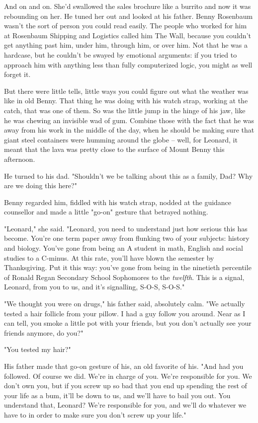 And on and on. She'd swallowed the sales brochure like a burrito
and now it was rebounding on her. He tuned her out and looked at
his father. Benny Rosenbaum wasn't the sort of person you could
read easily. The people who worked for him at Rosenbaum Shipping
and Logistics called him The Wall, because you couldn't get
anything past him, under him, through him, or over him. Not that he
was a hardcase, but he couldn't be swayed by emotional arguments:
if you tried to approach him with anything less than fully
computerized logic, you might as well forget it.

But there were little tells, little ways you could figure out what
the weather was like in old Benny. That thing he was doing with his
watch strap, working at the catch, that was one of them. So was the
little jump in the hinge of his jaw, like he was chewing an
invisible wad of gum. Combine those with the fact that he was away
from his work in the middle of the day, when he should be making
sure that giant steel containers were humming around the globe --
well, for Leonard, it meant that the lava was pretty close to the
surface of Mount Benny this afternoon.

He turned to his dad. "Shouldn't we be talking about this as a
family, Dad? Why are we doing this here?"

Benny regarded him, fiddled with his watch strap, nodded at the
guidance counsellor and made a little "go-on" gesture that betrayed
nothing.

"Leonard," she said. "Leonard, you need to understand just how
serious this has become. You're one term paper away from flunking
two of your subjects: history and biology. You've gone from being
an A student in math, English and social studies to a C-minus. At
this rate, you'll have blown the semester by Thanksgiving. Put it
this way: you've gone from being in the ninetieth percentile of
Ronald Regan Secondary School Sophomores to the \emph{twelfth}.
This is a signal, Leonard, from you to us, and it's signalling,
S-O-S, S-O-S."

"We thought you were on drugs," his father said, absolutely calm.
"We actually tested a hair follicle from your pillow. I had a guy
follow you around. Near as I can tell, you smoke a little pot with
your friends, but you don't actually see your friends anymore, do
you?"

"You tested my hair?"

His father made that go-on gesture of his, an old favorite of his.
"And had you followed. Of course we did. We're in charge of you.
We're responsible for you. We don't own you, but if you screw up so
bad that you end up spending the rest of your life as a bum, it'll
be down to us, and we'll have to bail you out. You understand that,
Leonard? We're responsible for you, and we'll do whatever we have
to in order to make sure you don't screw up your life."

